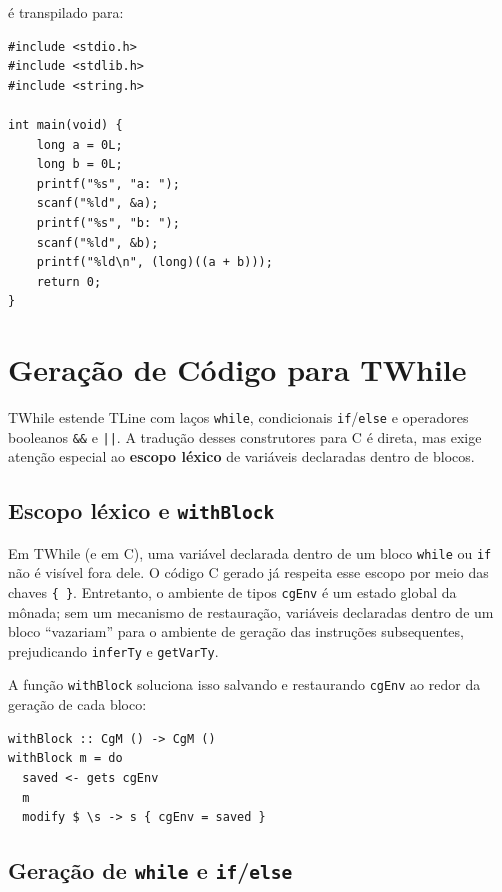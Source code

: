 é transpilado para:

\begin{verbatim}
#include <stdio.h>
#include <stdlib.h>
#include <string.h>

int main(void) {
    long a = 0L;
    long b = 0L;
    printf("%s", "a: ");
    scanf("%ld", &a);
    printf("%s", "b: ");
    scanf("%ld", &b);
    printf("%ld\n", (long)((a + b)));
    return 0;
}
\end{verbatim}

\section{Geração de Código para TWhile}\label{sec:codegen-twhile}

TWhile estende TLine com laços \texttt{while}, condicionais
\texttt{if}/\texttt{else} e operadores booleanos \texttt{\&\&} e \texttt{||}.
A tradução desses construtores para C é direta, mas exige atenção especial ao
\textbf{escopo léxico} de variáveis declaradas dentro de blocos.

\subsection{Escopo léxico e \texttt{withBlock}}

Em TWhile (e em C), uma variável declarada dentro de um bloco \texttt{while}
ou \texttt{if} não é visível fora dele.  O código C gerado já respeita esse
escopo por meio das chaves \texttt{\{ \}}.  Entretanto, o ambiente de tipos
\texttt{cgEnv} é um estado global da mônada; sem um mecanismo de restauração,
variáveis declaradas dentro de um bloco ``vazariam'' para o ambiente de
geração das instruções subsequentes, prejudicando \texttt{inferTy} e
\texttt{getVarTy}.

A função \texttt{withBlock} soluciona isso salvando e restaurando
\texttt{cgEnv} ao redor da geração de cada bloco:

\begin{verbatim}
withBlock :: CgM () -> CgM ()
withBlock m = do
  saved <- gets cgEnv
  m
  modify $ \s -> s { cgEnv = saved }
\end{verbatim}

\subsection{Geração de \texttt{while} e \texttt{if}/\texttt{else}}

